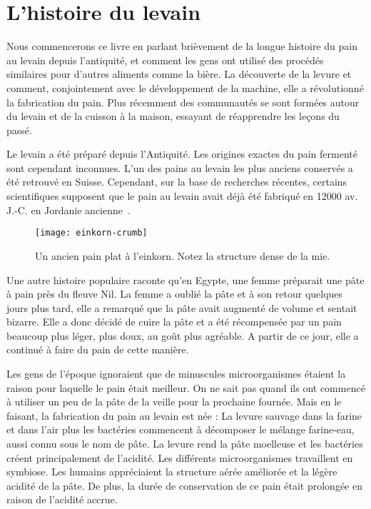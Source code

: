 \chapter{L'histoire du levain}%
\label{ch:history}
\begin{quoting}
    Nous commencerons ce livre en parlant brièvement de la longue histoire du
    pain au levain depuis l'antiquité, et comment les gens ont utilisé des procédés similaires pour
    d'autres aliments comme la bière. La découverte de la levure et comment, conjointement avec
    le développement de la machine, elle a révolutionné la fabrication du pain. Plus récemment
    des communautés se sont formées autour du levain et de la cuisson à la maison, essayant de réapprendre
    les leçons du passé.
\end{quoting}

Le levain a été préparé depuis l'Antiquité. Les origines exactes du pain fermenté
sont cependant inconnues. L'un des pains au levain les plus anciens conservés
a été retrouvé en Suisse. 
Cependant, sur la base de recherches récentes, certains scientifiques supposent que le pain au levain
avait déjà été fabriqué en 12000 av. J.-C. en Jordanie ancienne~\cite{jordan+bread}.

\begin{figure}[ht]
  \texttt{[image: einkorn-crumb]}
  \caption[Ancien pain plat à l'einkorn]{Un ancien pain plat à l'einkorn. Notez la
      structure dense de la mie.}%
  \label{einkorn-crumb}
\end{figure}

Une autre histoire populaire raconte qu'en Egypte, une femme préparait
une pâte à pain près du fleuve Nil. La femme a oublié la
pâte et à son retour quelques jours plus tard, elle a remarqué que la pâte avait
augmenté de volume et sentait bizarre. Elle a donc décidé de cuire
la pâte et a été récompensée par un pain
beaucoup plus léger, plus doux, au goût plus agréable. A partir de ce jour,
elle a continué à faire du pain de cette manière.

Les gens de l'époque ignoraient que de minuscules microorganismes
étaient la raison pour laquelle le pain était meilleur. On ne sait pas quand
ils ont commencé à utiliser un peu de la pâte de la veille
pour la prochaine fournée. Mais en le faisant, la fabrication
du pain au levain est née : La levure sauvage dans la farine et dans l'air
plus les bactéries commencent à décomposer le mélange farine-eau, aussi
connu sous le nom de pâte. La levure rend la pâte moelleuse et
les bactéries créent principalement de l'acidité. Les différents
microorganismes travaillent en symbiose. Les humains
appréciaient la structure aérée améliorée et la légère acidité
de la pâte. De plus, la durée de conservation de ce pain
était prolongée en raison de l'acidité accrue.

